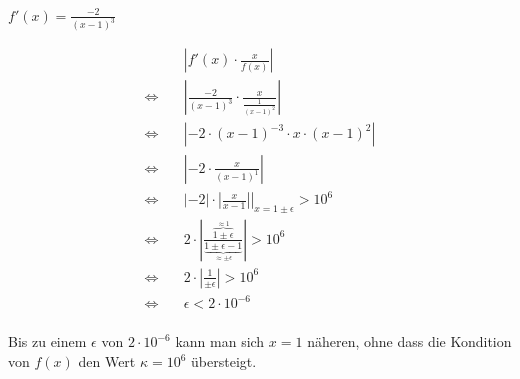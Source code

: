\documentclass[12pt]{article}
\begin{document}
\begin{enumerate}
          \begin{solution}
              $f'(x) = \frac{-2}{(x-1)^3}$

              \begin{align*}
                             & \left|f'\left(x\right)\cdot \frac{x}{f\left(x\right)}\right|                                                               \\
                  \iff \quad & \left|\frac{-2}{(x-1)^3}\cdot \frac{x}{\frac{1}{(x-1)^2}}\right|                                                           \\
                  \iff \quad & \left|-2\cdot (x-1)^{-3}\cdot x \cdot (x-1)^2\right|                                                                       \\
                  \iff \quad & \left|-2\cdot \frac{x}{(x-1)^1}\right|                                                                                     \\
                  \iff \quad & \left|-2\right| \cdot \left. \left|\frac{x}{x-1}\right| \right\rvert_{x=1\pm\epsilon} > 10^6                               \\
                  \iff \quad & 2 \cdot \left|\frac{\overbrace{1\pm\epsilon}^{\approx 1}}{\underbrace{1\pm\epsilon-1}_{\approx \pm\epsilon}}\right| > 10^6 \\
                  \iff \quad & 2 \cdot \left|\frac{1}{\pm\epsilon}\right| > 10^6                                                                          \\
                  \iff \quad & \epsilon < 2 \cdot 10^{-6}                                                                                                 \\
              \end{align*}

              Bis zu einem $\epsilon$ von $2 \cdot 10^{-6}$ kann man sich $x=1$ näheren, ohne dass die Kondition von $f(x)$ den Wert $\kappa=10^6$ übersteigt.
          \end{solution}
\end{enumerate}
\pagebreak
\end{document}
